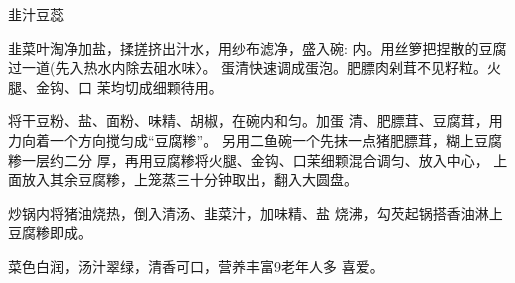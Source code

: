 \begin{recipe}{韭汁豆蕊}

\ingredients


\cooking

\step 	韭菜叶淘净加盐，揉搓挤出汁水，用纱布滤净，盛入碗: 内。用丝箩把捏散的豆腐过一道(先入热水内除去砠水味〉。 蛋清快速调成蛋泡。肥膘肉剁茸不见籽粒。火腿、金钩、口 茉均切成细颗待用。

\step 	将干豆粉、盐、面粉、味精、胡椒，在碗内和匀。加蛋 清、肥膘茸、豆腐茸，用力向着一个方向搅匀成“豆腐糁”。 另用二鱼碗一个先抹一点猪肥膘茸，糊上豆腐糁一层约二分 厚，再用豆腐糁将火腿、金钩、口茉细颗混合调匀、放入中心， 上面放入其余豆腐糁，上笼蒸三十分钟取出，翻入大圆盘。

\step 	炒锅内将猪油烧热，倒入清汤、韭菜汁，加味精、盐 烧沸，勾芡起锅搭香油淋上豆腐糁即成。

\notes

菜色白润，汤汁翠绿，清香可口，营养丰富9老年人多 喜爱。

\end{recipe}

